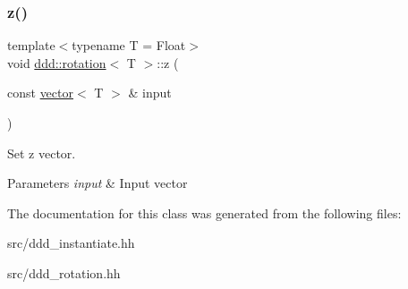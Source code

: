 \subsubsection{\texorpdfstring{z()}{z()}}
{\footnotesize\ttfamily template$<$typename T  = Float$>$ \\
void \hyperlink{classddd_1_1rotation}{ddd\+::rotation}$<$ T $>$\+::z (\begin{DoxyParamCaption}\item[{const \hyperlink{classddd_1_1vector}{vector}$<$ T $>$ \&}]{input }\end{DoxyParamCaption})\hspace{0.3cm}{\ttfamily [inline]}}



Set z vector. 


\begin{DoxyParams}{Parameters}
{\em input} & Input vector \\
\hline
\end{DoxyParams}


The documentation for this class was generated from the following files\+:\begin{DoxyCompactItemize}
\item 
src/ddd\+\_\+instantiate.\+hh\item 
src/ddd\+\_\+rotation.\+hh\end{DoxyCompactItemize}
